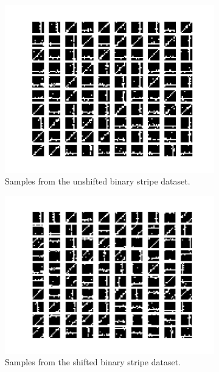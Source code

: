 \begin{figure}[h!]
	\centering
	\begin{subfigure}[t]{.49\textwidth}
  		\centering
  		\includegraphics[width=.9\linewidth]{imgs/stripes1.png}
  		\caption{Samples from the unshifted binary stripe dataset.}
  		\label{fig:sub1}
	\end{subfigure}%
	\begin{subfigure}[t]{.49\textwidth}
  		\centering
  		\includegraphics[width=.9\linewidth]{imgs/stripes2.png}
  		\caption{Samples from the  shifted binary stripe dataset.}
  		\label{fig:sub2}
	\end{subfigure}
	\begin{subfigure}[t]{.49\textwidth}
  		\centering

\end{subfigure}
\end{figure}
